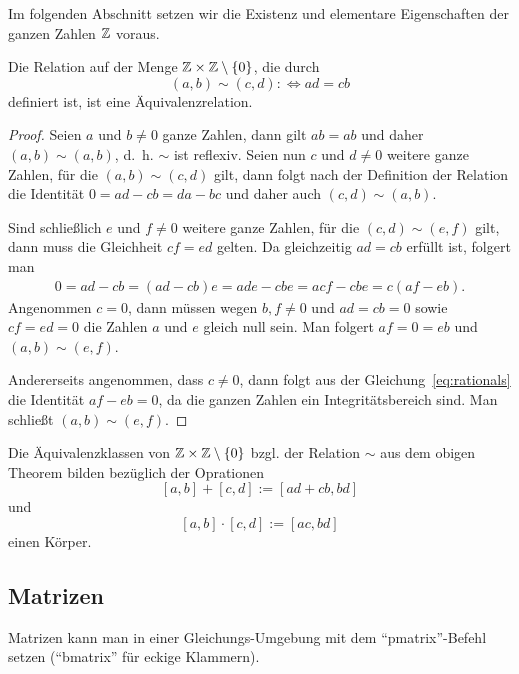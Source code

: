 Im folgenden Abschnitt setzen wir die Existenz und elementare Eigenschaften der ganzen Zahlen $\mathbb{Z}$ voraus.

\begin{thm}
  Die Relation auf der Menge $\mathbb{Z} \times \mathbb{Z} \setminus \lbrace 0 \rbrace$, die durch
  \[ (a, b) \sim (c, d) :\Leftrightarrow ad = cb \]
  definiert ist, ist eine Äquivalenzrelation.
\end{thm} 

\begin{proof}
  Seien $a$ und $b \neq 0$ ganze Zahlen, dann gilt $ab = ab$ und daher $(a, b) \sim (a, b)$, d.~h. $\sim$ ist reflexiv. Seien nun $c$ und $d \neq 0$ weitere ganze Zahlen, für die $(a, b) \sim (c, d)$ gilt, dann folgt nach der Definition der Relation die Identität $0 = ad - cb = da - bc$ und daher auch $(c, d) \sim (a, b)$.
  
  Sind schließlich $e$ und $f \neq 0$ weitere ganze Zahlen, für die $(c, d) \sim (e, f)$ gilt, dann muss die Gleichheit $cf = ed$ gelten.
  Da gleichzeitig $ad = cb$ erfüllt ist, folgert man
  \begin{align}\label{eq:rationals}
    0 = ad - cb = (ad - cb) e = ade - cbe = acf - cbe = c (af - eb).
  \end{align}
Angenommen $c = 0$, dann müssen wegen $b, f \neq 0$ und $ad = cb = 0$ sowie $cf = ed = 0$ die Zahlen $a$ und $e$ gleich null sein. Man folgert $af = 0 = eb$ und $(a, b) \sim (e, f)$.
  
  Andererseits angenommen, dass $c \neq 0$, dann folgt aus der Gleichung~\ref{eq:rationals} die Identität $af - eb = 0$, da die ganzen Zahlen ein Integritätsbereich sind. Man schließt $(a, b) \sim (e, f)$.
\end{proof}

\begin{thm}\label{thm:rationals}
  Die Äquivalenzklassen von $\mathbb{Z} \times \mathbb{Z} \setminus \{0\}$ bzgl. der Relation $\sim$ aus dem obigen Theorem bilden bezüglich der Oprationen 
  \[ [a, b] + [c, d] := [ad + cb, bd] \]
  und
  \[ [a, b] \cdot [c, d] := [ac, bd] \]
  einen Körper.
\end{thm}

\subsection{Matrizen}
Matrizen kann man in einer Gleichungs-Umgebung mit dem ``pmatrix''-Befehl setzen (``bmatrix'' für eckige Klammern).

